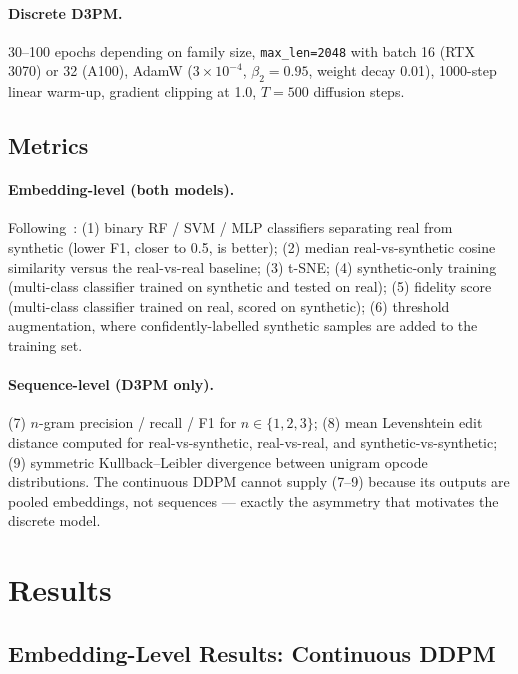 \documentclass[runningheads]{llncs}
\newcommand{\code}[1]{\texttt{#1}}
\begin{document}
\paragraph{Discrete D3PM.}
30--100 epochs depending on family size, \code{max\_len=2048} with batch 16
(RTX 3070) or 32 (A100), AdamW ($3 \times 10^{-4}$, $\beta_2=0.95$, weight
decay 0.01), 1000-step linear warm-up, gradient clipping at 1.0, $T=500$
diffusion steps.

\subsection{Metrics}

\paragraph{Embedding-level (both models).}
Following~\cite{bao2025diffusion}: (1) binary RF / SVM / MLP classifiers
separating real from synthetic (lower F1, closer to 0.5, is better);
(2) median real-vs-synthetic cosine similarity versus the real-vs-real
baseline; (3) t-SNE; (4) synthetic-only training (multi-class classifier
trained on synthetic and tested on real); (5) fidelity score (multi-class
classifier trained on real, scored on synthetic); (6) threshold augmentation,
where confidently-labelled synthetic samples are added to the training set.

\paragraph{Sequence-level (D3PM only).}
(7) $n$-gram precision / recall / F1 for $n \in \{1,2,3\}$;
(8) mean Levenshtein edit distance computed for real-vs-synthetic,
real-vs-real, and synthetic-vs-synthetic;
(9) symmetric Kullback--Leibler divergence between unigram opcode
distributions. The continuous DDPM cannot supply (7--9) because its outputs
are pooled embeddings, not sequences --- exactly the asymmetry that motivates
the discrete model.

\section{Results}
\label{sec:results}

\subsection{Embedding-Level Results: Continuous DDPM}
\end{document}
